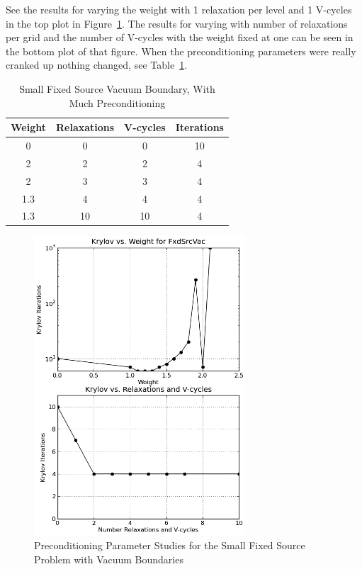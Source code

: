 See the results for varying the weight with 1 relaxation per level and 1 V-cycles in the top plot in Figure~\ref{fig:FxdSrcVac}. The results for varying with number of relaxations per grid and the number of V-cycles with the weight fixed at one can be seen in the bottom plot of that figure. When the preconditioning parameters were really cranked up nothing changed, see Table~\ref{table:FxdSrcTstVacOther}.
%
\begin{table}[!h]
\caption{Small Fixed Source Vacuum Boundary, With Much Preconditioning}
\begin{center}
\begin{tabular}{c c c c}
\hline
Weight & Relaxations & V-cycles & Iterations \\[0.5ex]
\hline
0  & 0 & 0 & 10 \\
2 & 2 & 2 & 4 \\
2 & 3 & 3 & 4 \\
1.3 & 4 & 4 & 4 \\
1.3 & 10 & 10 & 4 \\
\hline 
\end{tabular}
\end{center}
\label{table:FxdSrcTstVacOther}
\end{table}
%
\begin{figure}[!ht]
    \begin{center}
      \includegraphics [width=0.7\textwidth, height=0.8\textheight] {FxdSrcVac}
   \end{center}
   \caption{Preconditioning Parameter Studies for the Small Fixed Source Problem with Vacuum Boundaries}
   \label{fig:FxdSrcVac}
\end{figure}

